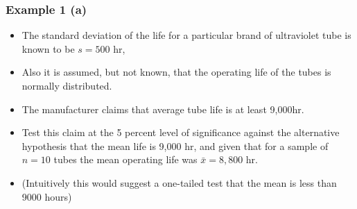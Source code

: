 








\begin{frame}
\frametitle{Example 1 (a)}
\large
\begin{itemize}
\item The standard deviation of the life for a particular brand of ultraviolet tube is known to be $s = 500$ hr,
\item Also it is assumed, but not known, that the operating life of the tubes is normally distributed. \item The manufacturer claims that average tube life
is at least 9,000hr. \item Test this claim at the 5 percent level of significance against the alternative hypothesis
that the mean life is 9,000 hr, and given that for a sample of $n = 10$ tubes the mean operating
life was $\bar{x} = 8,800$ hr.
\item (Intuitively this would suggest a one-tailed test that the mean is less than 9000 hours)
\end{itemize}
\end{frame}


